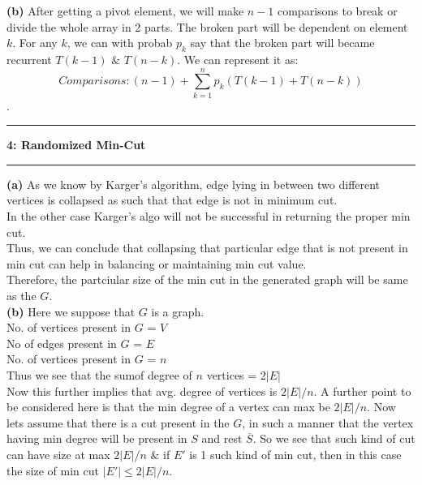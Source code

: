 \documentclass[11pt]{article}
\newcommand\question[2]{\vspace{.25in}\hrule\textbf{#1: #2}\vspace{.5em}\hrule\vspace{.10in}}
\renewcommand\part[1]{\vspace{.10in}\textbf{(#1)}}
\begin{document}
\part{b} After getting a pivot element, we will make $n-1$ comparisons to break or divide the whole array in 2 parts. The broken part will be dependent on element $k$. For any $k$, we can with probab $p_{k}$ say that the broken part will became recurrent $T(k-1)$ $\&$ $T(n-k)$. We can represent it as: \\$$Comparisons: (n-1) + \sum_{k=1}^{n} p_{k}(T(k-1)+T(n-k))$$.

\question{4}{Randomized Min-Cut}

\part{a} As we know by Karger's algorithm, edge lying in between two different vertices is collapsed as such that that edge is not in minimum cut.\\
In the other case Karger's algo will not be successful in returning the proper min cut.\\
Thus, we can conclude that collapsing that particular edge that is not present in min cut can help in balancing or maintaining min cut value. \\Therefore, the partciular size of the min cut in the generated graph  
will be same as the $G$.\\

\part{b} Here we suppose that $G$ is a graph.\\
No. of vertices present in $G$ = $V$\\
No of edges present in $G$ = $E$\\
No. of vertices present in $G$ = $n$\\
Thus we see that the sumof degree of $n$ vertices = $2|E|$\\
Now this further implies that avg. degree of vertices is $2|E|/n$. A further point to be considered here is that 
the min degree of a vertex can max be $2|E|/n$. Now lets assume that there is a cut present in the $G$, in such a manner that the vertex having min degree will be present in $S$ and rest $\overline{S}$. So we see that such kind of cut can have size at max $2|E|/n$ $\&$ if $E'$ is 1 such kind of min cut, then in this case the size of min cut $|E'|\le 2|E|/n$.
\end{document}
